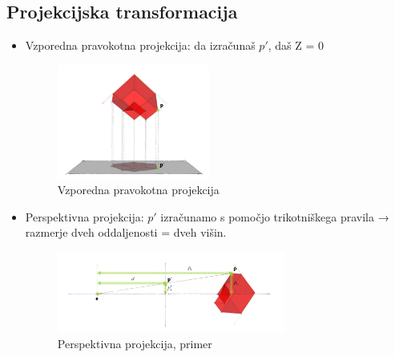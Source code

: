 \documentclass{article}
\begin{document}
\subsection{Projekcijska transformacija}
\begin{itemize}
    \item Vzporedna pravokotna projekcija: da izračunaš $p'$, daš Z = 0
        \begin{figure}[H]
        \centering
        \includegraphics[width=50mm]{src/vzporedna_pravokotna_projekcija.png}
        \caption{Vzporedna pravokotna projekcija}
        \end{figure}     
    \item Perspektivna projekcija: $p'$ izračunamo s pomočjo trikotniškega pravila → razmerje dveh oddaljenosti = dveh višin. \\
        \begin{figure}[H]
        \centering
        \includegraphics[width=75mm]{src/perspektivna_projekcija_transformacija.png}
        \caption{Perspektivna projekcija, primer}
        \end{figure} \\

\end{itemize}
\end{document}

